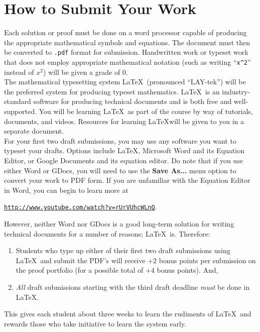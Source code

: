 \documentclass[11pt]{article}
\begin{document}
\section{How to Submit Your Work}

Each solution or proof must be done on a word processor capable of producing the appropriate mathematical symbols and equations.   The document must then be converted to \texttt{.pdf} format for submission. Handwritten work or typeset work that does not employ appropriate mathematical notation (such as writing ``\verb=x^2='' instead of $x^2$) will be given a grade of 0. \\

The mathematical typesetting system \LaTeX\ (pronounced ``LAY-tek'') will be the preferred system for producing typeset mathematics. \LaTeX\ is an industry-standard software for producing technical documents and is both free and well-supported. You will be learning \LaTeX\ as part of the course by way of tutorials, documents, and videos. Resources for learning \LaTeX will be given to you in a separate document. \\

For your first two draft submissions, you may use any software you want to typeset your drafts. Options include \LaTeX, Microsoft Word and its Equation Editor, or Google Documents and its equation editor. Do note that if you use either Word or GDocs, you will need to use the \textbf{Save As...} menu option to convert your work to PDF form. If you are unfamiliar with the Equation Editor in Word, you can begin to learn more at 
\begin{center}
\href{http://www.youtube.com/watch?v=rUrVUhcWLnQ}{\texttt{http://www.youtube.com/watch?v=rUrVUhcWLnQ}}. 
\end{center}

However, neither Word nor GDocs is a good long-term solution for writing technical documents for a number of reasons; \LaTeX\ is. Therefore: 
\begin{enumerate}[itemsep=0pt]
	\item Students who type up either of their first two draft submissions using \LaTeX\ and submit the PDF's will receive $+2$ bonus points per submission on the proof portfolio (for a possible total of $+4$ bonus points). And,
	\item \emph{All} draft submissions starting with the third draft deadline \emph{must} be done in \LaTeX. 
\end{enumerate}
This gives each student about three weeks to learn the rudiments of \LaTeX\ and rewards those who take initiative to learn the system early. \\ 
\end{document}
